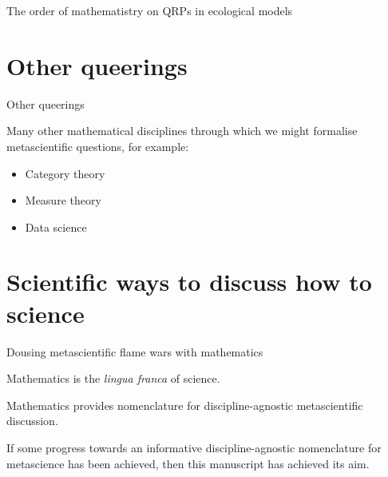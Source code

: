 \documentclass{beamer}
\begin{document}
\begin{frame}{\large{The order of mathematistry on QRPs in ecological models}}
\begin{adjustbox}{max totalsize={.9\textwidth}{.9\textheight},center}
\end{adjustbox}

\end{frame}



\section{Other queerings}

\begin{frame}{Other queerings}

Many other mathematical disciplines through which we might formalise metascientific questions, for example:

\begin{itemize}
    \item Category theory
    \item Measure theory
    \item Data science
\end{itemize}

\end{frame}

\section{Scientific ways to discuss how to science}

\begin{frame}{Dousing metascientific flame wars with mathematics}
    
Mathematics is the \emph{lingua franca} of science.

\bigskip

Mathematics provides nomenclature for discipline-agnostic metascientific discussion.

\bigskip

If some progress towards an informative discipline-agnostic nomenclature for metascience has been achieved, then this manuscript has achieved its aim.
    
\end{frame}
\end{document}
